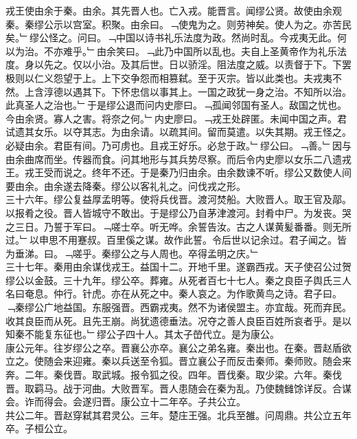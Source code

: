 \documentclass{zhvt-classic}
\begin{document}
\hspace*{2em}戎王使由余于秦。由余。其先晋人也。亡入戎。能晋言。闻缪公贤。故使由余观秦。秦缪公示以宫室。积聚。由余曰。﹁使鬼为之。则劳神矣。使人为之。亦苦民矣。﹂缪公怪之。问曰。﹁中国以诗书礼乐法度为政。然尚时乱。今戎夷无此。何以为治。不亦难乎。﹂由余笑曰。﹁此乃中国所以乱也。夫自上圣黄帝作为礼乐法度。身以先之。仅以小治。及其后世。日以骄淫。阻法度之威。以责督于下。下罢极则以仁义怨望于上。上下交争怨而相篡弑。至于灭宗。皆以此类也。夫戎夷不然。上含淳德以遇其下。下怀忠信以事其上。一国之政犹一身之治。不知所以治。此真圣人之治也。﹂于是缪公退而问内史廖曰。﹁孤闻邻国有圣人。敌国之忧也。今由余贤。寡人之害。将奈之何。﹂内史廖曰。﹁戎王处辟匿。未闻中国之声。君试遗其女乐。以夺其志。为由余请。以疏其间。留而莫遣。以失其期。戎王怪之。必疑由余。君臣有间。乃可虏也。且戎王好乐。必怠于政。﹂缪公曰。﹁善。﹂因与由余曲席而坐。传器而食。问其地形与其兵势尽察。而后令内史廖以女乐二八遗戎王。戎王受而说之。终年不还。于是秦乃归由余。由余数谏不听。缪公又数使人间要由余。由余遂去降秦。缪公以客礼礼之。问伐戎之形。\\
\hspace*{2em}三十六年。缪公复益厚孟明等。使将兵伐晋。渡河焚船。大败晋人。取王官及鄗。以报肴之役。晋人皆城守不敢出。于是缪公乃自茅津渡河。封肴中尸。为发丧。哭之三日。乃誓于军曰。﹁嗟士卒。听无哗。余誓告汝。古之人谋黄髪番番。则无所过。﹂以申思不用蹇叔。百里傒之谋。故作此誓。令后世以记余过。君子闻之。皆为垂涕。曰。﹁嗟乎。秦缪公之与人周也。卒得孟明之庆。﹂\\
\hspace*{2em}三十七年。秦用由余谋伐戎王。益国十二。开地千里。遂霸西戎。天子使召公过贺缪公以金鼓。三十九年。缪公卒。葬雍。从死者百七十七人。秦之良臣子舆氏三人名曰奄息。仲行。针虎。亦在从死之中。秦人哀之。为作歌黄鸟之诗。君子曰。﹁秦缪公广地益国。东服强晋。西霸戎夷。然不为诸侯盟主。亦宜哉。死而弃民。收其良臣而从死。且先王崩。尚犹遗德垂法。况夺之善人良臣百姓所哀者乎。是以知秦不能复东征也。﹂缪公子四十人。其太子嵤代立。是为康公。\\
\hspace*{2em}康公元年。往岁缪公之卒。晋襄公亦卒。襄公之弟名雍。秦出也。在秦。晋赵盾欲立之。使随会来迎雍。秦以兵送至令狐。晋立襄公子而反击秦师。秦师败。随会来奔。二年。秦伐晋。取武城。报令狐之役。四年。晋伐秦。取少梁。六年。秦伐晋。取羁马。战于河曲。大败晋军。晋人患随会在秦为乱。乃使魏雠馀详反。合谋会。诈而得会。会遂归晋。康公立十二年卒。子共公立。\\
\hspace*{2em}共公二年。晋赵穿弑其君灵公。三年。楚庄王强。北兵至雒。问周鼎。共公立五年卒。子桓公立。\\
\end{document}

